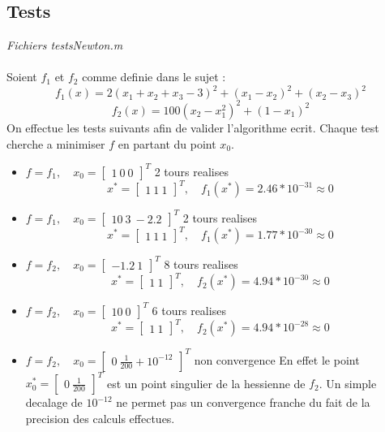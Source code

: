 \documentclass[12pt]{article}
\begin{document}
\subsection{Tests}
\begin{flushright}
\textit{Fichiers testsNewton.m}
\end{flushright}
\paragraph{}
Soient $f_1$ et $f_2$ comme definie dans le sujet :
	\[f_1(x) = 2(x_1 + x_2 + x_3 - 3)^2 + (x_1 - x_2)^2 + (x_2 - x_3)^2\]
	\[f_2(x) = 100(x_2 - x_1^2)^2+(1-x_1)^2\]
On effectue les tests suivants afin de valider l'algorithme ecrit. Chaque test cherche a minimiser $f$ en partant du point $x_0$.
\begin{itemize}
	\item $f=f_1,\quad x_0 = \left[\begin{array}{c}1\ 0\ 0\end{array}\right]^T$ 2 tours realises
			\[x^* = \left[\begin{array}{c}1\ 1\ 1\end{array}\right]^T,\quad f_1(x^*) = 2.46*10^{-31} \approx 0\]
	\item $f=f_1,\quad x_0 = \left[\begin{array}{c}10\ 3\ -2.2\end{array}\right]^T$ 2 tours realises
			\[x^* = \left[\begin{array}{c}1\ 1\ 1\end{array}\right]^T,\quad f_1(x^*) = 1.77*10^{-30} \approx 0\]
	\item $f=f_2,\quad x_0 = \left[\begin{array}{c}-1.2\ 1\end{array}\right]^T$ 8 tours realises
			\[x^* = \left[\begin{array}{c}1\ 1\end{array}\right]^T,\quad f_2(x^*) = 4.94*10^{-30} \approx 0\]
	\item $f=f_2,\quad x_0 = \left[\begin{array}{c}10\ 0\end{array}\right]^T$ 6 tours realises
			\[x^* = \left[\begin{array}{c}1\ 1\end{array}\right]^T,\quad f_2(x^*) =  4.94*10^{-28} \approx 0\]
	\item $f=f_2,\quad x_0 = \left[\begin{array}{c}0\ \frac{1}{200} + 10^{-12}\end{array}\right]^T$ non convergence
	\newline En effet le point $x_0^* = \left[\begin{array}{c}0\ \frac{1}{200}\end{array}\right]^T$ est un point singulier de la hessienne de $f_2$. Un simple decalage de $10^{-12}$ ne permet pas un convergence franche du fait de la precision des calculs effectues.
\end{itemize}
\end{document}
